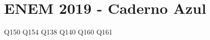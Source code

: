 \chapter{ENEM 2019 - Caderno Azul}

\begin{multicols}{2}
{Q150}
{Q154}
{Q138}
{Q140}
{Q160}
{Q161}
%
%
    
\end{multicols}



